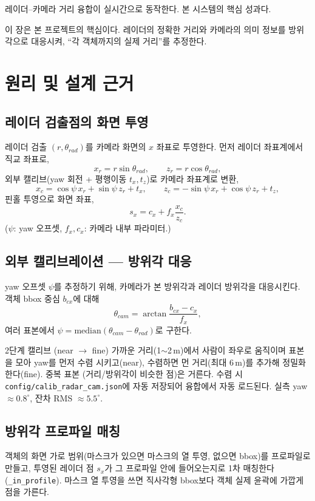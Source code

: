 \begin{statusdone}
레이더--카메라 거리 융합이 실시간으로 동작한다. 본 시스템의 핵심 성과다.
\end{statusdone}

이 장은 본 프로젝트의 핵심이다. 레이더의 정확한 거리와 카메라의 의미 정보를
방위각으로 대응시켜, ``각 객체까지의 실제 거리''를 추정한다.

\chapter{원리 및 설계 근거}

\section{레이더 검출점의 화면 투영}
레이더 검출 $(r, \theta_{rad})$를 카메라 화면의 $x$ 좌표로 투영한다. 먼저 레이더
좌표계에서 직교 좌표로,
\[
  x_r = r\sin\theta_{rad},\qquad z_r = r\cos\theta_{rad},
\]
외부 캘리브(yaw 회전 + 평행이동 $t_x, t_z$)로 카메라 좌표계로 변환,
\[
  x_c = \cos\psi\, x_r + \sin\psi\, z_r + t_x,\qquad
  z_c = -\sin\psi\, x_r + \cos\psi\, z_r + t_z,
\]
핀홀 투영으로 화면 좌표,
\[
  s_x = c_x + f_x \frac{x_c}{z_c}.
\]
($\psi$: yaw 오프셋, $f_x, c_x$: 카메라 내부 파라미터.)

\section{외부 캘리브레이션 — 방위각 대응}
yaw 오프셋 $\psi$를 추정하기 위해, 카메라가 본 방위각과 레이더 방위각을 대응시킨다.
객체 bbox 중심 $b_{cx}$에 대해
\[
  \theta_{cam} = \arctan\!\frac{b_{cx}-c_x}{f_x},
\]
여러 표본에서 $\psi = \mathrm{median}(\theta_{cam}-\theta_{rad})$로 구한다.

\begin{designbox}{2단계 캘리브 (near $\to$ fine)}
가까운 거리(1$\sim$2\,m)에서 사람이 좌우로 움직이며 표본을 모아 yaw를 먼저 수렴
시키고(near), 수렴하면 먼 거리(최대 6\,m)를 추가해 정밀화한다(fine). 중복 표본
(거리/방위각이 비슷한 점)은 거른다. 수렴 시 \texttt{config/calib\_radar\_cam.json}에
자동 저장되어 융합에서 자동 로드된다. 실측 yaw $\approx 0.8^\circ$, 잔차 RMS
$\approx 5.5^\circ$.
\end{designbox}

\section{방위각 프로파일 매칭}
객체의 화면 가로 범위(마스크가 있으면 마스크의 열 투영, 없으면 bbox)를
프로파일로 만들고, 투영된 레이더 점 $s_x$가 그 프로파일 안에 들어오는지로 1차
매칭한다(\texttt{\_in\_profile}). 마스크 열 투영을 쓰면 직사각형 bbox보다 객체
실제 윤곽에 가깝게 점을 가른다.

